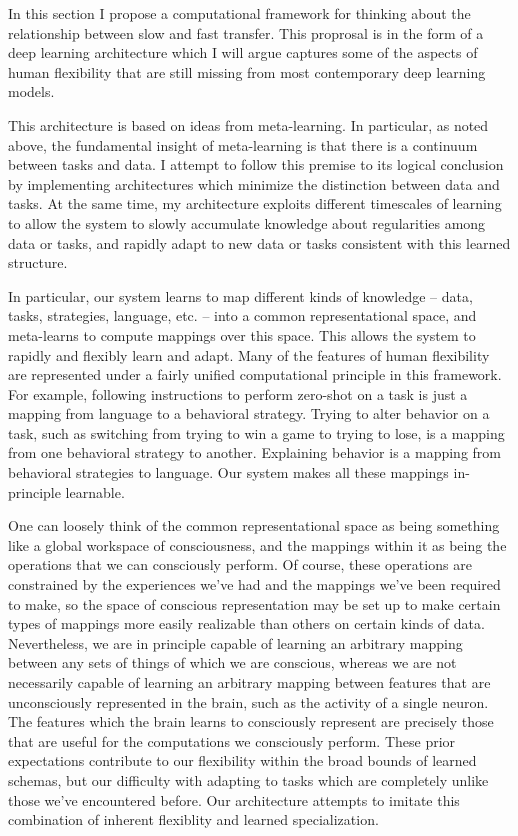 \documentclass[11pt]{article}
\begin{document}
In this section I propose a computational framework for thinking about the relationship between slow and fast transfer. This proprosal is in the form of a deep learning architecture which I will argue captures some of the aspects of human flexibility that are still missing from most contemporary deep learning models. \par

This architecture is based on ideas from meta-learning. In particular, as noted above, the fundamental insight of meta-learning is that there is a continuum between tasks and data. I attempt to follow this premise to its logical conclusion by implementing architectures which minimize the distinction between data and tasks. At the same time, my architecture exploits different timescales of learning to allow the system to slowly accumulate knowledge about regularities among data or tasks, and rapidly adapt to new data or tasks consistent with this learned structure. \par

In particular, our system learns to map different kinds of knowledge -- data, tasks, strategies, language, etc. -- into a common representational space, and meta-learns to compute mappings over this space. This allows the system to rapidly and flexibly learn and adapt. Many of the features of human flexibility are represented under a fairly unified computational principle in this framework. For example, following instructions to perform zero-shot on a task is just a mapping from language to a behavioral strategy. Trying to alter behavior on a task, such as switching from trying to win a game to trying to lose, is a mapping from one behavioral strategy to another. Explaining behavior is a mapping from behavioral strategies to language. Our system makes all these mappings in-principle learnable. \par 

One can loosely think of the common representational space as being something like a global workspace of consciousness, and the mappings within it as being the operations that we can consciously perform. Of course, these operations are constrained by the experiences we've had and the mappings we've been required to make, so the space of conscious representation may be set up to make certain types of mappings more easily realizable than others on certain kinds of data. Nevertheless, we are in principle capable of learning an arbitrary mapping between any sets of things of which we are conscious, whereas we are not necessarily capable of learning an arbitrary mapping between features that are unconsciously represented in the brain, such as the activity of a single neuron. The features which the brain learns to consciously represent are precisely those that are useful for the computations we consciously perform. These prior expectations contribute to our flexibility within the broad bounds of learned schemas, but our difficulty with adapting to tasks which are completely unlike those we've encountered before. Our architecture attempts to imitate this combination of inherent flexiblity and learned specialization. \par  
\end{document}
